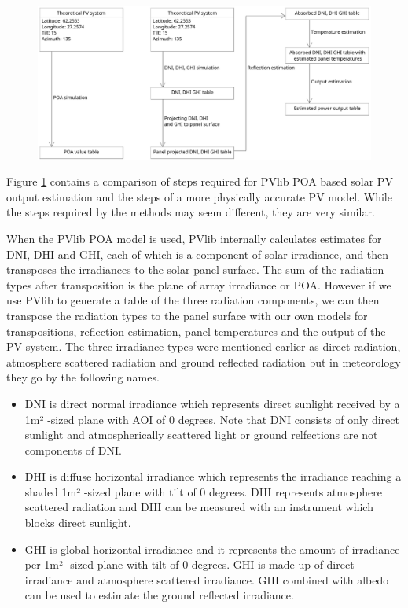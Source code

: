 \begin{figure}[h]
\centering
\includegraphics[width=1.0\linewidth]{pics/uml2}
\label{fig-pv_model}
\end{figure}


\noindent 
Figure \ref{fig-pv_model} contains a comparison of steps required for PVlib POA based solar PV output estimation and the steps of a more physically accurate PV model. While the steps required by the methods may seem different, they are very similar.

When the PVlib POA model is used, PVlib internally calculates estimates for DNI, DHI and GHI, each of which is a component of solar irradiance, and then transposes the irradiances to the solar panel surface. The sum of the radiation types after transposition is the plane of array irradiance or POA. However if we use PVlib to generate a table of the three radiation components, we can then transpose the radiation types to the panel surface with our own models for transpositions, reflection estimation, panel temperatures and the output of the PV system. The three irradiance types were mentioned earlier as direct radiation, atmosphere scattered radiation and ground reflected radiation but in meteorology they go by the following names.



\begin{itemize}
\item DNI is direct normal irradiance which represents direct sunlight received by a 1m² -sized plane with AOI of 0 degrees. Note that DNI consists of only direct sunlight and atmospherically scattered light or ground relfections are not components of DNI.

\item DHI is diffuse horizontal irradiance which represents the irradiance reaching a shaded 1m² -sized plane with tilt of 0 degrees. DHI represents atmosphere scattered radiation and DHI can be measured with an instrument which blocks direct sunlight.

\item GHI is global horizontal irradiance and it represents the amount of irradiance per 1m² -sized plane with tilt of 0 degrees. GHI is made up of direct irradiance and atmosphere scattered irradiance. GHI combined with albedo can be used to estimate the ground reflected irradiance.
\end{itemize}

